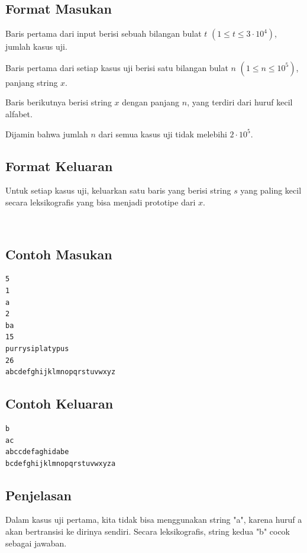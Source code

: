 \documentclass{article}
\begin{document}
\subsection*{Format Masukan}

Baris pertama dari input berisi sebuah bilangan bulat $t$ $(1 \leq t \leq 3 \cdot 10^4)$, jumlah kasus uji.

Baris pertama dari setiap kasus uji berisi satu bilangan bulat $n$ $(1 \leq n \leq 10^5)$, panjang string $x$.

Baris berikutnya berisi string $x$ dengan panjang $n$, yang terdiri dari huruf kecil alfabet.

Dijamin bahwa jumlah $n$ dari semua kasus uji tidak melebihi $2 \cdot 10^5$.



\subsection*{Format Keluaran}

Untuk setiap kasus uji, keluarkan satu baris yang berisi string $s$ yang paling kecil secara leksikografis yang bisa menjadi prototipe dari $x$.

\\

\begin{multicols}{2}
\subsection*{Contoh Masukan}
\begin{lstlisting}
5
1
a
2
ba
15
purrysiplatypus
26
abcdefghijklmnopqrstuvwxyz

\end{lstlisting}
\columnbreak
\subsection*{Contoh Keluaran}
\begin{lstlisting}
b
ac
abccdefaghidabe
bcdefghijklmnopqrstuvwxyza
\end{lstlisting}
\end{multicols}

\subsection*{Penjelasan}
Dalam kasus uji pertama, kita tidak bisa menggunakan string "a", karena huruf a akan bertransisi ke dirinya sendiri. Secara leksikografis, string kedua "b" cocok sebagai jawaban.
\end{document}
